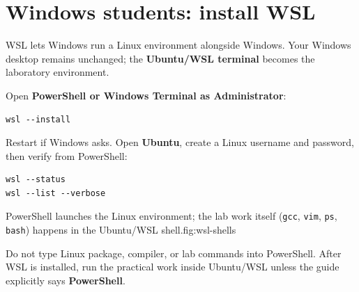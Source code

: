 \section*{Windows students: install WSL}
WSL lets Windows run a Linux environment alongside Windows. Your Windows desktop remains unchanged; the \textbf{Ubuntu/WSL terminal} becomes the laboratory environment.

Open \textbf{PowerShell or Windows Terminal as Administrator}:
\begin{lstlisting}[style=utpbash]
wsl --install
\end{lstlisting}
Restart if Windows asks. Open \textbf{Ubuntu}, create a Linux username and password, then verify from PowerShell:
\begin{lstlisting}[style=utpbash]
wsl --status
wsl --list --verbose
\end{lstlisting}

\begin{utpfig}{PowerShell launches the Linux environment; the lab work itself (\texttt{gcc}, \texttt{vim}, \texttt{ps}, \texttt{bash}) happens in the Ubuntu/WSL shell.}{fig:wsl-shells}
\end{utpfig}

\begin{pitfall}
Do not type Linux package, compiler, or lab commands into PowerShell. After WSL is installed, run the practical work inside Ubuntu/WSL unless the guide explicitly says \textbf{PowerShell}.
\end{pitfall}

